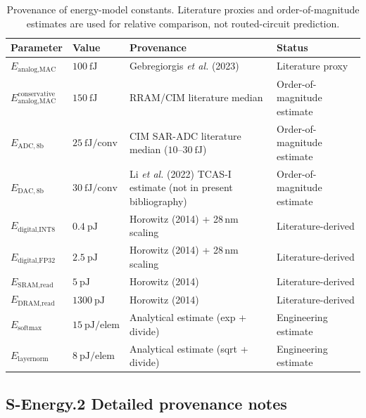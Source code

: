 \begin{table}[ht]
\centering
\small
\begin{tabular}{@{}>{\raggedright\arraybackslash}p{}>{\raggedright\arraybackslash}p{}>{\raggedright\arraybackslash}p{}>{\raggedright\arraybackslash}p{}@{}}
\toprule
\textbf{Parameter} & \textbf{Value} & \textbf{Provenance} & \textbf{Status} \\
\midrule
$E_{\text{analog,MAC}}$ & $100~\text{fJ}$ & Gebregiorgis \textit{et al.} (2023) \cite{gebregiorgis2023organiccim} & Literature proxy \\
$E_{\text{analog,MAC}}^{\text{conservative}}$ & $150~\text{fJ}$ & RRAM/CIM literature median & Order-of-magnitude estimate \\
$E_{\text{ADC},8\text{b}}$ & $25~\text{fJ/conv}$ & CIM SAR-ADC literature median ($10$--$30~\text{fJ}$) & Order-of-magnitude estimate \\
$E_{\text{DAC},8\text{b}}$ & $30~\text{fJ/conv}$ & Li \textit{et al.} (2022) TCAS-I estimate (not in present bibliography) & Order-of-magnitude estimate \\
$E_{\text{digital,INT8}}$ & $0.4~\text{pJ}$ & Horowitz (2014) \cite{horowitz2014computing} + 28\,nm scaling & Literature-derived \\
$E_{\text{digital,FP32}}$ & $2.5~\text{pJ}$ & Horowitz (2014) \cite{horowitz2014computing} + 28\,nm scaling & Literature-derived \\
$E_{\text{SRAM,read}}$ & $5~\text{pJ}$ & Horowitz (2014) \cite{horowitz2014computing} & Literature-derived \\
$E_{\text{DRAM,read}}$ & $1300~\text{pJ}$ & Horowitz (2014) \cite{horowitz2014computing} & Literature-derived \\
$E_{\text{softmax}}$ & $15~\text{pJ/elem}$ & Analytical estimate (exp + divide) & Engineering estimate \\
$E_{\text{layernorm}}$ & $8~\text{pJ/elem}$ & Analytical estimate (sqrt + divide) & Engineering estimate \\
\bottomrule
\end{tabular}
\caption{Provenance of energy-model constants. Literature proxies and order-of-magnitude estimates are used for relative comparison, not routed-circuit prediction.}
\label{tab:energy-provenance}
\end{table}

\subsection*{S-Energy.2 Detailed provenance notes}

